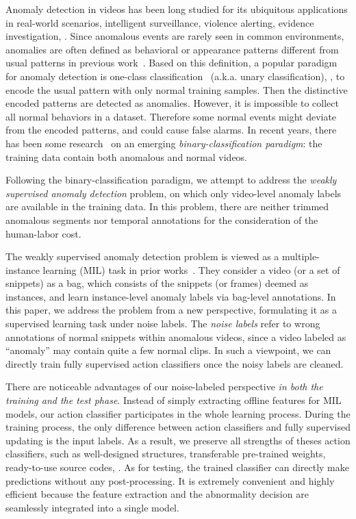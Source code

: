 \documentclass[10pt,twocolumn,letterpaper]{article}
\begin{document}
Anomaly detection in videos has been long studied for its ubiquitous applications in real-world scenarios, \eg intelligent surveillance, violence alerting, evidence investigation, \etc. Since anomalous events are rarely seen in common environments, anomalies are often defined as behavioral or appearance patterns different from usual patterns in previous work~\cite{benezeth2009co,adam2008monitors,cong2011sparse}. Based on this definition, a popular paradigm for anomaly detection is one-class classification~\cite{xu2015deep,cheng2015cvpr} (a.k.a. unary classification), \ie, to encode the usual pattern with only normal training samples. Then the distinctive encoded patterns are detected as anomalies. However, it is impossible to collect all normal behaviors in a dataset. Therefore some normal events might deviate from the encoded patterns, and could cause false alarms. In recent years, there has been some research~\cite{he2017anomaly,10.1007/978-3-642-32639-4_10,Sultani_2018_CVPR} on an emerging \emph{binary-classification paradigm}: the training data contain both anomalous and normal videos.

Following the binary-classification paradigm, we attempt to address the \emph{weakly supervised anomaly detection} problem, on which only video-level anomaly labels are available in the training data. In this problem, there are neither trimmed anomalous segments nor temporal annotations for the consideration of the human-labor cost. 

The weakly supervised anomaly detection problem is viewed as a multiple-instance learning (MIL) task in prior works~\cite{he2017anomaly,10.1007/978-3-642-32639-4_10,Sultani_2018_CVPR}. They consider a video (or a set of snippets) as a bag, which consists of the snippets (or frames) deemed as instances, and learn instance-level anomaly labels via bag-level annotations. In this paper, we address the problem from a new perspective, formulating it as a supervised learning task under noise labels. The \emph{noise labels} refer to wrong annotations of normal snippets within anomalous videos, since a video labeled as ``anomaly'' may contain quite a few normal clips. In such a viewpoint, we can directly train fully supervised action classifiers once the noisy labels are cleaned. 

There are noticeable advantages of our noise-labeled perspective \emph{in both the training and the test phase}. Instead of simply extracting offline features for MIL models, our action classifier participates in the whole learning process. During the training process, the only difference between action classifiers and fully supervised updating is the input labels. As a result, we preserve all strengths of theses action classifiers, such as well-designed structures, transferable pre-trained weights, ready-to-use source codes, \etc. As for testing, the trained classifier can directly make predictions without any post-processing. It is extremely convenient and highly efficient because the feature extraction and the abnormality decision are seamlessly integrated into a single model.
\end{document}

